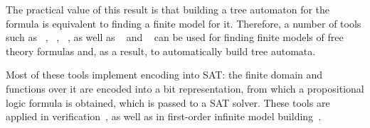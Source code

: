 The practical value of this result is that building a tree automaton for the formula is equivalent to finding a finite model for it. Therefore, a number of tools such as \mace{}~\cite{https://doi.org/10.48550/arxiv.cs/0310055}, \kodkod{}~\cite{10.1007/978-3-540-71209-1_49}, \paradox{}~\cite{claessen2003new}, as well as \cvc{}~\cite{reynolds2013finite} and \vampire{}~\cite{10.1007/978-3-319-40970-2_20} can be used for finding finite models of free theory formulas and, as a result, to automatically build tree automata.


Most of these tools implement encoding into SAT: the finite domain and functions over it are encoded into a bit representation, from which a propositional logic formula is obtained, which is passed to a SAT solver.
These tools are applied in verification~\cite{lisitsa2012finite}, as well as in first-order infinite model building~\cite{peltier2009constructing}.

